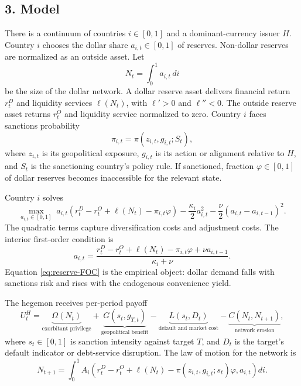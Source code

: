 \documentclass[11pt]{article}
\begin{document}
\subsection*{3. Model}
There is a continuum of countries $i\in[0,1]$ and a dominant-currency issuer $H$. Country $i$ chooses the dollar share $a_{i,t}\in[0,1]$ of reserves. Non-dollar reserves are normalized as an outside asset. Let
\begin{equation}
N_t=\int_0^1 a_{i,t}\,di
\end{equation}
be the size of the dollar network. A dollar reserve asset delivers financial return $r^D_t$ and liquidity services $\ell(N_t)$, with $\ell'>0$ and $\ell''<0$. The outside reserve asset returns $r^O_t$ and liquidity service normalized to zero. Country $i$ faces sanctions probability
\begin{equation}
\pi_{i,t}=\pi(z_{i,t},g_{i,t};S_t),
\end{equation}
where $z_{i,t}$ is its geopolitical exposure, $g_{i,t}$ is its action or alignment relative to $H$, and $S_t$ is the sanctioning country's policy rule. If sanctioned, fraction $\varphi\in[0,1]$ of dollar reserves becomes inaccessible for the relevant state.

Country $i$ solves
\begin{equation}
\max_{a_{i,t}\in[0,1]} \; a_{i,t}\left(r_t^D-r_t^O+\ell(N_t)-\pi_{i,t}\varphi\right)-\frac{\kappa_i}{2}a_{i,t}^2-\frac{\nu}{2}(a_{i,t}-a_{i,t-1})^2. \label{eq:reserve-choice}
\end{equation}
The quadratic terms capture diversification costs and adjustment costs. The interior first-order condition is
\begin{equation}
a_{i,t}=\frac{r_t^D-r_t^O+\ell(N_t)-\pi_{i,t}\varphi+\nu a_{i,t-1}}{\kappa_i+\nu}. \label{eq:reserve-FOC}
\end{equation}
Equation \eqref{eq:reserve-FOC} is the empirical object: dollar demand falls with sanctions risk and rises with the endogenous convenience yield.

The hegemon receives per-period payoff
\begin{equation}
U^H_t=\underbrace{\Omega(N_t)}_{\text{exorbitant privilege}}+\underbrace{G(s_t,g_{T,t})}_{\text{geopolitical benefit}}-\underbrace{L(s_t,D_t)}_{\text{default and market cost}}-\underbrace{C(N_t,N_{t+1})}_{\text{network erosion}}, \label{eq:hegemon}
\end{equation}
where $s_t\in[0,1]$ is sanction intensity against target $T$, and $D_t$ is the target's default indicator or debt-service disruption. The law of motion for the network is
\begin{equation}
N_{t+1}=\int_0^1 A_i\left(r_t^D-r_t^O+\ell(N_t)-\pi(z_{i,t},g_{i,t};s_t)\varphi,a_{i,t}\right)di. \label{eq:network-law}
\end{equation}
\end{document}
